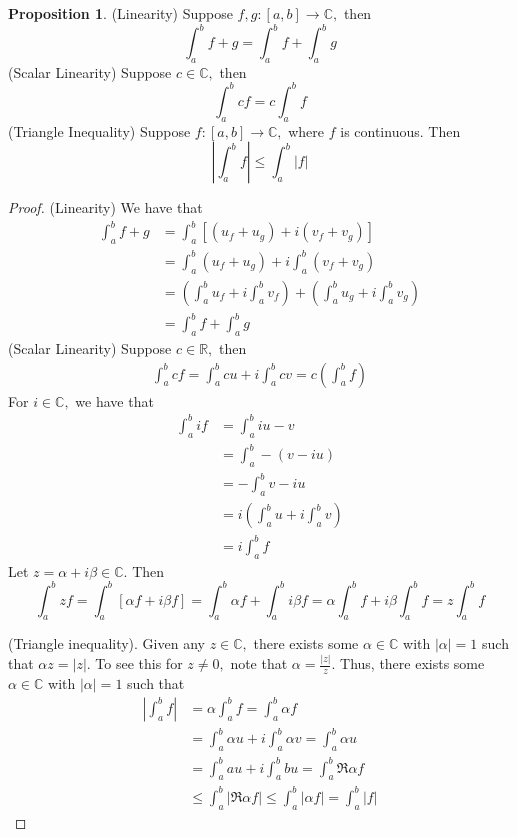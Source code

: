 \documentclass[10pt, oneside]{article}
\newcommand{\bbR}{\mathbb{R}}
\newcommand{\bbC}{\mathbb{C}}
\theoremstyle{definition}
\newtheorem{prop}{Proposition}
\begin{document}
\begin{prop}
    (Linearity) Suppose $f, g: [a,b] \to \bbC,$ then 
    \[\int_a^b f + g = \int_a^b f + \int_a^b g\]
    (Scalar Linearity) Suppose $c \in \bbC,$ then 
    \[\int_a^b c f = c\int_a^b f\]
    (Triangle Inequality) Suppose $f: [a,b] \to \bbC,$ where $f$ is continuous. Then 
    \[\left| \int_a^b f\right|\leq \int_a^b |f|\]
\end{prop}
\begin{proof}
    (Linearity) We have that 
    \begin{align*}
        \int_a^b f + g &= \int_a^b \left[(u_f + u_g) + i(v_f + v_g)\right]\\
        &=\int_a^b( u_f + u_g) + i\int_a^b(v_f + v_g)\\ 
        &= (\int_a^b u_f + i \int_a^b v_f) + (\int_a^b u_g + i \int_a^b v_g)\\
        &= \int_a^b f + \int_a^b g
    \end{align*}
    (Scalar Linearity) Suppose $c\in \bbR,$ then
    \begin{align*}
        \int_a^b cf = \int_a^b c u + i\int_a^b c v = c(\int_a^b f)
    \end{align*}
    For $i \in \bbC,$ we have that 
    \begin{align*}
        \int_a^b if &= \int_a^b iu - v\\
        &= \int_a^b-(v - iu)\\
        &= -\int_a^b v - iu\\
        &= i\left(\int_a^b u + i \int_a^b v\right)\\
        &= i \int_a^b f
    \end{align*}
    Let $z = \alpha + i \beta \in \bbC.$ Then 
    \[\int_a^b z f = \int_a^b \left[\alpha f + i\beta f\right] = \int_a^b \alpha f  + \int_a^b i\beta f = \alpha \int_a^b f + i\beta \int_a^b f = z \int_a^b f\]

    (Triangle inequality). Given any $z\in \bbC,$ there exists some $\alpha \in \bbC$ with $|\alpha| = 1$ such that $\alpha z = |z|.$ To see this for $z\neq 0,$ note that $\alpha = \frac{|z|}{z}.$ Thus, there exists some $\alpha \in \bbC$ with $|\alpha| = 1$ such that
    \begin{align*}
        \left|\int_a^b f\right| &= \alpha \int_a^b f = \int_a^b \alpha f\\
        &= \int_a^b \alpha u + i \int_a^b \alpha v= \int_a^b \alpha u\\
        &= \int_a^b au + i\int_a^b bu= \int_a^b \Re{\alpha f}\\
        &\leq \int_a^b |\Re{\alpha f}|
        \leq \int_a^b |\alpha f| = \int_a^b |f|
    \end{align*}
\end{proof}
\end{document}
